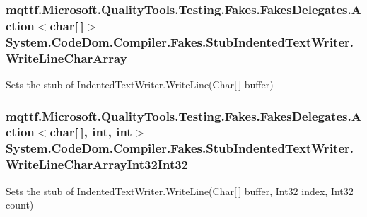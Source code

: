 \hypertarget{class_system_1_1_code_dom_1_1_compiler_1_1_fakes_1_1_stub_indented_text_writer_adfb2355de3485238791d3398e1f61f48}{
\subsubsection[{Write\-Line\-Char\-Array}]{\setlength{\rightskip}{0pt plus 5cm}mqttf.\-Microsoft.\-Quality\-Tools.\-Testing.\-Fakes.\-Fakes\-Delegates.\-Action$<$char\mbox{[}$\,$\mbox{]}$>$ System.\-Code\-Dom.\-Compiler.\-Fakes.\-Stub\-Indented\-Text\-Writer.\-Write\-Line\-Char\-Array}}\label{class_system_1_1_code_dom_1_1_compiler_1_1_fakes_1_1_stub_indented_text_writer_adfb2355de3485238791d3398e1f61f48}


Sets the stub of Indented\-Text\-Writer.\-Write\-Line(\-Char\mbox{[}$\,$\mbox{]} buffer)

\hypertarget{class_system_1_1_code_dom_1_1_compiler_1_1_fakes_1_1_stub_indented_text_writer_a6f50babb5e7cb650c2add884a2e142c2}{
\subsubsection[{Write\-Line\-Char\-Array\-Int32\-Int32}]{\setlength{\rightskip}{0pt plus 5cm}mqttf.\-Microsoft.\-Quality\-Tools.\-Testing.\-Fakes.\-Fakes\-Delegates.\-Action$<$char\mbox{[}$\,$\mbox{]}, int, int$>$ System.\-Code\-Dom.\-Compiler.\-Fakes.\-Stub\-Indented\-Text\-Writer.\-Write\-Line\-Char\-Array\-Int32\-Int32}}\label{class_system_1_1_code_dom_1_1_compiler_1_1_fakes_1_1_stub_indented_text_writer_a6f50babb5e7cb650c2add884a2e142c2}


Sets the stub of Indented\-Text\-Writer.\-Write\-Line(\-Char\mbox{[}$\,$\mbox{]} buffer, Int32 index, Int32 count)

